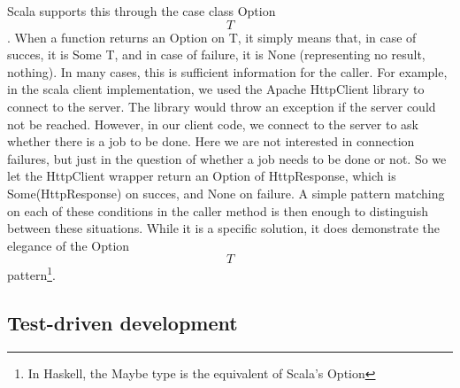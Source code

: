 Scala supports this through the case class Option\[T\]. When a function returns an Option on T,
it simply means that, in case of succes, it is Some T, and in case of failure, it is
None (representing no result, nothing). In many cases, this is sufficient information
for the caller. For example, in the scala client implementation, we used the Apache HttpClient
library \cite{HttpClient} to connect to the server. The library would throw an exception if
the server could not be reached. However, in our client code, we connect to the server
to ask whether there is a job to be done. Here we are not interested in connection failures,
but just in the question of whether a job needs to be done or not. So we let the HttpClient
wrapper return an Option of HttpResponse, which is Some(HttpResponse) on succes, and None
on failure. A simple pattern matching on each of these conditions in the caller method is then 
enough to distinguish between these situations. While it is a specific solution, it does
demonstrate the elegance of the Option\[T\] pattern\footnote{In Haskell, the Maybe type is the equivalent of Scala's Option}.

\subsection{Test-driven development}
